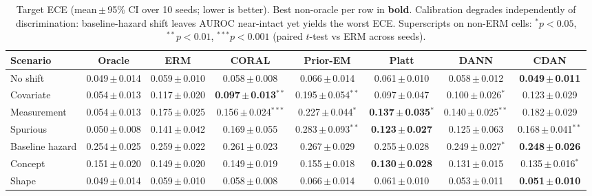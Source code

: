 \begin{table}[t]\centering\small
\setlength{\tabcolsep}{4pt}
\begin{tabular}{lccccccc}
\toprule
Scenario & Oracle & ERM & CORAL & Prior-EM & Platt & DANN & CDAN \\
\midrule
No shift & 0.049\,$\pm$\,0.014 & 0.059\,$\pm$\,0.010 & 0.058\,$\pm$\,0.008 & 0.066\,$\pm$\,0.014 & 0.061\,$\pm$\,0.010 & 0.058\,$\pm$\,0.012 & \textbf{0.049\,$\pm$\,0.011} \\
Covariate & 0.054\,$\pm$\,0.013 & 0.117\,$\pm$\,0.020 & \textbf{0.097\,$\pm$\,0.013$^{**}$} & 0.195\,$\pm$\,0.054$^{**}$ & 0.097\,$\pm$\,0.047 & 0.100\,$\pm$\,0.026$^{*}$ & 0.123\,$\pm$\,0.029 \\
Measurement & 0.054\,$\pm$\,0.013 & 0.175\,$\pm$\,0.025 & 0.156\,$\pm$\,0.024$^{***}$ & 0.227\,$\pm$\,0.044$^{*}$ & \textbf{0.137\,$\pm$\,0.035$^{*}$} & 0.140\,$\pm$\,0.025$^{**}$ & 0.182\,$\pm$\,0.029 \\
Spurious & 0.050\,$\pm$\,0.008 & 0.141\,$\pm$\,0.042 & 0.169\,$\pm$\,0.055 & 0.283\,$\pm$\,0.093$^{**}$ & \textbf{0.123\,$\pm$\,0.027} & 0.125\,$\pm$\,0.063 & 0.168\,$\pm$\,0.041$^{**}$ \\
Baseline hazard & 0.254\,$\pm$\,0.025 & 0.259\,$\pm$\,0.022 & 0.261\,$\pm$\,0.023 & 0.267\,$\pm$\,0.029 & 0.255\,$\pm$\,0.028 & 0.249\,$\pm$\,0.027$^{*}$ & \textbf{0.248\,$\pm$\,0.026} \\
Concept & 0.151\,$\pm$\,0.020 & 0.149\,$\pm$\,0.020 & 0.149\,$\pm$\,0.019 & 0.155\,$\pm$\,0.018 & \textbf{0.130\,$\pm$\,0.028} & 0.131\,$\pm$\,0.015 & 0.135\,$\pm$\,0.016$^{*}$ \\
Shape & 0.049\,$\pm$\,0.014 & 0.059\,$\pm$\,0.010 & 0.058\,$\pm$\,0.008 & 0.066\,$\pm$\,0.014 & 0.061\,$\pm$\,0.010 & 0.053\,$\pm$\,0.011 & \textbf{0.051\,$\pm$\,0.010} \\
\bottomrule
\end{tabular}
\caption{Target ECE (mean\,$\pm$\,95\% CI over 10 seeds; lower is better). Best non-oracle per row in \textbf{bold}. Calibration degrades independently of discrimination: baseline-hazard shift leaves AUROC near-intact yet yields the worst ECE. Superscripts on non-ERM cells: $^{*}p{<}0.05$, $^{**}p{<}0.01$, $^{***}p{<}0.001$ (paired $t$-test vs ERM across seeds).}
\label{tab:ece}
\end{table}
